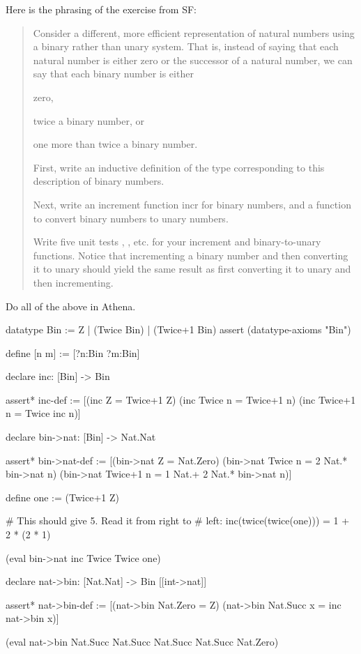 \begin{exercise}
Here is the phrasing of the exercise from SF: 
\begin{quote}
Consider a different, more efficient representation of natural numbers using a binary rather than unary system. That is,
instead of saying that each natural number is either zero or the successor of a
natural number, we can say that each binary number is either
\bit
\item zero,
\item twice a binary number, or
\item one more than twice a binary number.
\eit 
\begin{alphaEnum}
\item First, write an inductive definition of the type  corresponding to this
description of binary numbers.
\item Next, write an increment function incr for binary numbers, and a function
 to convert binary numbers to unary numbers.
\item Write five unit tests , , etc. for your increment and binary-to-unary functions. Notice that incrementing a binary
number and then converting it to unary should yield the same result as
first converting it to unary and then incrementing.
\end{alphaEnum}
\end{quote}
Do all of the above in Athena. 
\end{exercise}
\begin{solution}
\begin{tcAthena}
datatype Bin := Z | (Twice Bin) | (Twice+1 Bin)
assert (datatype-axioms "Bin")

define [n m] := [?n:Bin ?m:Bin]

declare inc: [Bin] -> Bin

assert* inc-def := [(inc Z = Twice+1 Z)     
                    (inc Twice n = Twice+1 n)  
                    (inc Twice+1 n = Twice inc n)]

declare bin->nat: [Bin] -> Nat.Nat 

assert* bin->nat-def := [(bin->nat Z = Nat.Zero)
                         (bin->nat Twice n = 2 Nat.* bin->nat n)
                         (bin->nat Twice+1 n = 1 Nat.+ 2 Nat.* bin->nat n)]

define one := (Twice+1 Z)                     

# This should give 5. Read it from right to 
# left: inc(twice(twice(one))) = 1 + 2 * (2 * 1)

(eval bin->nat inc Twice Twice one)

declare nat->bin: [Nat.Nat] -> Bin [[int->nat]]

assert* nat->bin-def := [(nat->bin Nat.Zero = Z)
                         (nat->bin Nat.Succ x = inc nat->bin x)]

(eval nat->bin Nat.Succ Nat.Succ Nat.Succ Nat.Succ Nat.Zero)
\end{tcAthena}
\end{solution}

